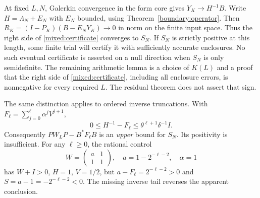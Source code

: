 At fixed $L,N$, Galerkin convergence in the form core gives
$Y_K\to H^{-1}B$. Write $H=\Lambda_N+E_N$ with $E_N$ bounded,
using Theorem~\ref{boundary:operator}. Then
$R_K=(I-P_K)(B-E_NY_K)\to0$ in norm on the finite input space.
Thus the right side of \eqref{mixed:certificate} converges to $S_N$.
If $S_N$ is strictly positive at this length, some finite trial
will certify it with sufficiently accurate enclosures. No such
eventual certificate is asserted on a null direction when $S_N$
is only semidefinite.
The remaining arithmetic lemma is a choice of $K(L)$ and a proof
that the right side of \eqref{mixed:certificate}, including all
enclosure errors, is nonnegative for every required $L$.
The residual theorem does not assert that sign.

The same distinction applies to ordered inverse truncations.
With $F_\ell=\sum_{j=0}^{\ell}\alpha^jV^{j+1}$,
\[
0\le H^{-1}-F_\ell\le\theta^{\ell+1}\delta^{-1}I.
\]
Consequently $PW_LP-B^*F_\ell B$ is an \emph{upper} bound for $S_N$.
Its positivity is insufficient. For any $\ell\ge0$, the rational
control
\[
W=\begin{pmatrix}a&1\\1&1\end{pmatrix},\quad
a=1-2^{-\ell-2},\quad \alpha=1
\]
has $W+I>0$, $H=1$, $V=1/2$, but
$a-F_\ell=2^{-\ell-2}>0$ and $S=a-1=-2^{-\ell-2}<0$.
The missing inverse tail reverses the apparent conclusion.
